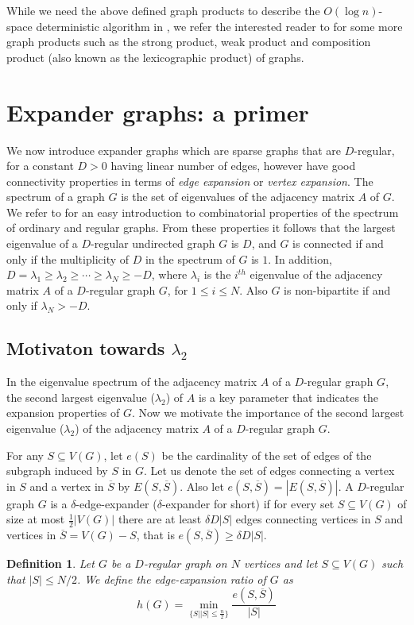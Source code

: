 \documentclass{article}
\newtheorem{definition}[theorem]{Definition}
\begin{document}
While we need the above defined graph products to describe the $O(\log n)$-space deterministic algorithm in \cite{Rei2008}, we refer the interested reader to \cite[pp. 297, 364 \& 316]{BM2008} for some more graph products such as the strong product, weak product and composition product (also known as the lexicographic product) of graphs.

\section{Expander graphs: a primer}\label{expandergraphs}
We now introduce expander graphs which are sparse graphs that are $D$-regular, for a constant $D>0$ having linear number of edges, however have good connectivity properties in terms of {\it edge expansion} or {\it vertex expansion}. The spectrum of a graph $G$ is the set of eigenvalues of the adjacency matrix $A$ of $G$. We refer to \cite[Chapters 2 and 3]{Big1993} for an easy introduction to combinatorial properties of the spectrum of ordinary and regular graphs. From these properties it follows that the largest eigenvalue of a $D$-regular undirected graph $G$ is $D$, and $G$ is connected if and only if the multiplicity of $D$ in the spectrum of $G$ is $1$. In addition, $D=\lambda _1\geq \lambda _2\geq\cdots\geq\lambda _N\geq -D$, where $\lambda _i$ is the $i^{th}$ eigenvalue of the adjacency matrix $A$ of a $D$-regular graph $G$, for $1\leq i\leq N$. Also $G$ is non-bipartite if and only if $\lambda _N>-D$.

\subsection{Motivaton towards $\lambda _2$}
In the eigenvalue spectrum of the adjacency matrix $A$ of a $D$-regular graph $G$, the second largest eigenvalue ($\lambda _2$) of $A$ is a key parameter that indicates the expansion properties of $G$. Now we motivate the importance of the second largest eigenvalue ($\lambda _2$) of the adjacency matrix $A$ of a $D$-regular graph $G$.

For any $S\subseteq V(G)$, let $e(S)$ be the cardinality of the set of edges of the subgraph induced by $S$ in $G$. Let us denote the set of edges connecting a vertex in $S$ and a vertex in $\overline{S}$ by $E(S,\overline{S})$. Also let $e(S,\overline{S})=|E(S,\overline{S})|$. A $D$-regular graph $G$ is a $\delta$-edge-expander ($\delta$-expander for short) if for every set $S\subseteq V(G)$ of size at most $\frac{1}{2}|V(G)|$ there are at least $\delta D|S|$ edges connecting vertices in $S$ and vertices in $\overline{S}=V(G)-S$, that is $e(S,\overline{S})\geq\delta D|S|$.
\begin{definition}%
Let $G$ be a $D$-regular graph on $N$ vertices and let $S\subseteq V(G)$ such that $|S|\leq N/2$. We define the edge-expansion ratio of $G$ as
\[
h(G)=\min _{\{S||S|\leq \frac{n}{2}\}}\frac{e(S,\overline{S})}{|S|}
\]
\end{definition}
\end{document}
